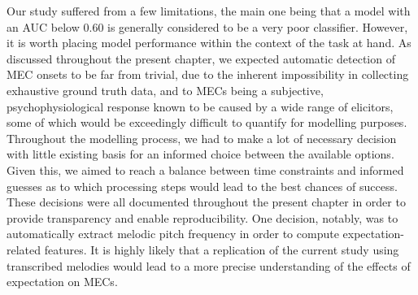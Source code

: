 Our study suffered from a few limitations, the main one being that a model with an AUC below 0.60 is generally considered to be a very poor classifier. However, it is worth placing model performance within the context of the task at hand. As discussed throughout the present chapter, we expected automatic detection of MEC onsets to be far from trivial, due to the inherent impossibility in collecting exhaustive ground truth data, and to MECs being a subjective, psychophysiological response known to be caused by a wide range of elicitors, some of which would be exceedingly difficult to quantify for modelling purposes. Throughout the modelling process, we had to make a lot of necessary decision with little existing basis for an informed choice between the available options. Given this, we aimed to reach a balance between time constraints and informed guesses as to which processing steps would lead to the best chances of success. These decisions were all documented throughout the present chapter in order to provide transparency and enable reproducibility. One decision, notably, was to automatically extract melodic pitch frequency in order to compute expectation-related features. It is highly likely that a replication of the current study using transcribed melodies would lead to a more precise understanding of the effects of expectation on MECs.

